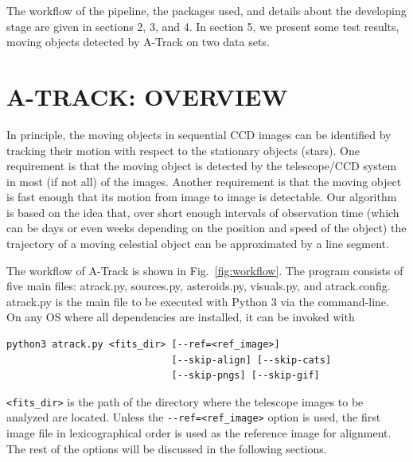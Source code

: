 \documentclass[review]{elsarticle}
\begin{document}
The workflow of the pipeline, the packages used, and details about the developing stage are given in sections 2, 3, and 4. In section 5, we present some test results, moving objects detected by A-Track on two data sets.


\section{A-TRACK: OVERVIEW} %

In principle, the moving objects in sequential CCD images can be identified by tracking their motion with respect to the stationary objects (stars). One requirement is that the moving object is detected by the telescope/CCD system in most (if not all) of the images. Another requirement is that the moving object is fast enough that its motion from image to image is detectable. Our algorithm is based on the idea that, over short enough intervals of observation time (which can be days or even weeks depending on the position and speed of the object) the trajectory of a moving celestial object can be approximated by a line segment.

The workflow of A-Track is shown in Fig.~\ref{fig:workflow}. The program consists of five main files: atrack.py, sources.py, asteroids.py, visuals.py, and atrack.config. atrack.py is the main file to be executed with Python 3 via the command-line. On any OS where all dependencies are installed, it can be invoked with

\begin{verbatim}
python3 atrack.py <fits_dir> [--ref=<ref_image>]
                             [--skip-align] [--skip-cats] 
                             [--skip-pngs] [--skip-gif]
\end{verbatim}

\verb;<fits_dir>; is the path of the directory where the telescope images to be analyzed are located. Unless the \verb;--ref=<ref_image>; option is used, the first image file in lexicographical order is used as the reference image for alignment. The rest of the options will be discussed in the following sections.
\end{document}
